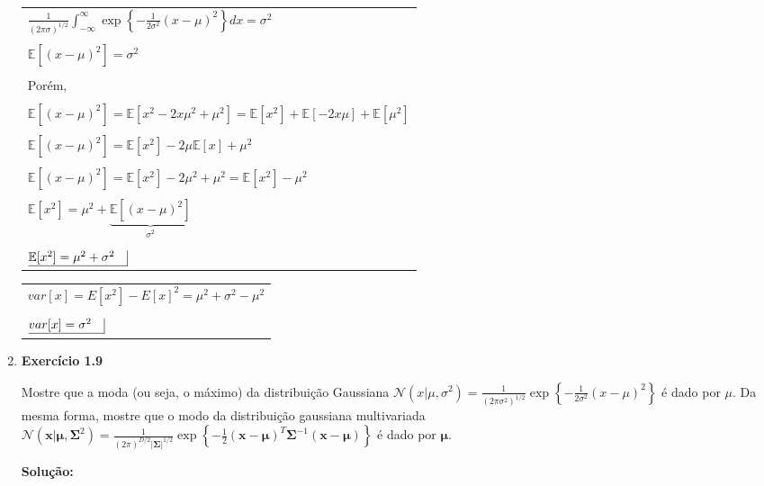 \begin{enumerate}
\begin{tabular}{l}
    \\
    $ \frac{1}{(2\pi\sigma)^{1/2}} \int_{-\infty}^{\infty} \exp\left\{ -\frac{1}{2\sigma^2}(x - \mu)^2 \right\} dx = \sigma^2 $\\
    \\
    $\mathbb{E}[(x-\mu)^2] = \sigma^2$\\
    \\
    Porém,\\
    \\
    $\mathbb{E}[(x-\mu)^2] = \mathbb{E}[x^2-2x\mu^2+\mu^2] =  \mathbb{E}[x^2]+\mathbb{E}[-2x\mu]+ \mathbb{E}[\mu^2]$\\
    \\
    $\mathbb{E}[(x-\mu)^2] = \mathbb{E}[x^2]-2\mu\mathbb{E}[x] +\mu^2$\\
    \\
    $\mathbb{E}[(x-\mu)^2] = \mathbb{E}[x^2]-2\mu^2 +\mu^2 = \mathbb{E}[x^2]-\mu^2$\\
    \\
    $\mathbb{E}[x^2] =\mu^2 + \underbrace{\mathbb{E}[(x-\mu)^2]}_{\sigma^2}$\\
    \\
    $\underline{ \mathbb{E}[x^2] =\mu^2 + \sigma^2 \quad} \vline$\\
\end{tabular}

\begin{tabular}{l}
\\
$var[x]=E[x^2]-E[x]^2=\mu^2+\sigma^2-\mu^2$\\
\\
$\underline{var[x]=\sigma^2 \quad} \vline$\\

\end{tabular}


\item \textbf{Exercício 1.9} \par

Mostre que a moda (ou seja, o máximo) da distribuição Gaussiana $\mathcal{N}(x | \mu, \sigma^2)= \frac{1}{(2\pi\sigma^2)^{1/2}}\exp\left\{ -\frac{1}{2\sigma^2}(x - \mu)^2 \right\}$  é dado por $\mu$. Da mesma forma, mostre que o modo da distribuição gaussiana multivariada 
$\mathcal{N}(\boldsymbol{x} | \boldsymbol{\mu}, \boldsymbol{\Sigma}^2)= \frac{1}{(2\pi)^{D/2}|\boldsymbol{\Sigma}|^{1/2}}\exp\left\{ -\frac{1}{2}(\boldsymbol{x} - \boldsymbol{\mu})^T \boldsymbol{\Sigma}^{-1}(\boldsymbol{x} - \boldsymbol{\mu})  \right\}$
é dado por $\boldsymbol{\mu}$.
\newline \par
\textbf{Solução:}


\end{enumerate}
